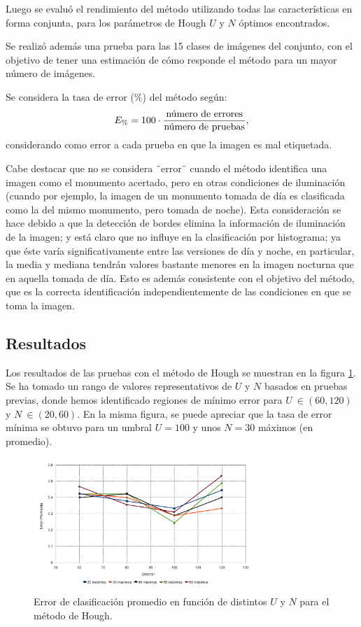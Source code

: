 \documentclass[conference,spanish,a4paper,10pt,oneside,final]{tfmpd}
\begin{document}
Luego se evaluó el rendimiento del método utilizando todas las características %
en forma conjunta, para los parámetros de Hough $U$ y $N$ óptimos encontrados.

Se realizó además una prueba para las 15 clases de imágenes %
del conjunto,
con el objetivo de tener una estimación de cómo responde %
el método para un mayor número de imágenes.

Se considera la tasa de error ($\%$) del método según:
\begin{equation}
E_\%=100\cdot\frac{\textrm{número de errores}}{\textrm{número de pruebas}},
\end{equation}
considerando como error a cada prueba en que la imagen es mal etiquetada.

Cabe destacar que no se considera %
¨error¨ %
cuando el método identifica
una imagen como el monumento acertado, pero en otras
condiciones de iluminación (cuando por ejemplo, la imagen de un monumento
tomada de día es clasificada como la del mismo monumento, pero tomada de noche).
Esta consideración se hace debido a que la detección de bordes elimina la
información de iluminación de la imagen; y está claro que no influye
en la clasificación por histograma; ya que éste varía significativamente
entre las versiones de día y noche, en particular, la media y mediana tendrán
valores bastante menores en la imagen nocturna que en aquella tomada de día.
Esto es además consistente con el objetivo del método, que es la correcta
identificación independientemente de las condiciones en que se toma la imagen.
%
%
\subsection{Resultados}

Los resultados de las pruebas con el método de Hough se muestran en la figura
\ref{graficaerror}. Se ha tomado un rango de valores representativos de $U$
y $N$ basados en pruebas previas, donde hemos identificado regiones de mínimo
error para $U~\in(60,120)$ y $N~\in(20,60)$.
En la misma figura, se puede apreciar que la tasa de error mínima se obtuvo
para un umbral $U = 100$ y unos $N = 30$ máximos (en promedio).

\begin{figure}
\begin{center}
\includegraphics[width=8.5cm]{../diagramas/estadistica_noche_iguales} 
\end{center}
\caption{Error de clasificación promedio en función de distintos $U$ y $N$ para
el método de Hough.}
\label{graficaerror}
\end{figure}
\end{document}
